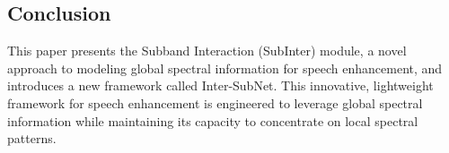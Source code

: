 \subsection{Conclusion}
This paper presents the Subband Interaction (SubInter) module, a novel approach to modeling global spectral information for speech enhancement, and introduces a new framework called Inter-SubNet. This innovative,
lightweight framework for speech enhancement is engineered to leverage global spectral information while maintaining its capacity to concentrate on local spectral patterns.
